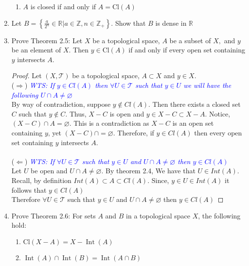 \documentclass[12pt]{article}
\newcommand{\TT}{\mathcal{T}}
\newcommand{\wts}[1]{\textit{\textcolor{blue}{WTS: #1}}\\}
\newcommand{\pp}{\textit{\textcolor{yellow}{PP: }}}%
\begin{document}
\begin{enumerate}
\begin{enumerate}
		\item[(c)] $A$ is closed if and only if $A = \mathrm { Cl } ( A )$\\
		
	\end{enumerate}
	\item[\pp2.07] Let $B=\left\{\frac{a}{2^{n}} \in \mathbb{R} | a \in \mathbb{Z}, n \in \mathbb{Z}_{+}\right\} .$ Show that $B$ is dense in $\mathbb{R}$
	
	\item[2.10] Prove Theorem 2.5: Let $X$ be a topological space, $A$ be a subset of $X,$ and $y$ be an element of $X .$ Then $y \in \mathrm{Cl}(A)$ if and only if every open set containing $y$ intersects $A$.
	\begin{proof}
		Let $ (X,\TT) $ be a topological space, $ A\subset X $ and $ y\in X $.\\
		($ \Rightarrow $) \wts{If $ y\in Cl(A) $ then $ \forall U \in \TT $ such that $ y\in U $ we will have the following $ U\cap A \not= \varnothing $}
		By way of contradiction, suppose $ y\not\in Cl(A) $. Then there exists a closed set $ C $ such that $ y\not\in C$. Thus, $ X-C $ is open and $ y\in X-C \subset X-A $. Notice, $ (X-C)\cap A = \varnothing $. This is a contradiction as $ X-C $ is an open set containing $ y $, yet $ (X-C)\cap = \varnothing $. 
		Therefore, if $ y\in Cl(A) $ then every open set containing $y$ intersects $A$.\\
		\\
		($\Leftarrow$) \wts{If $ \forall U \in \TT  $ such that $ y\in U $ and $ U\cap A \not= \varnothing $ then $ y\in Cl(A) $}
		 Let $U$ be open and $ U\cap A \not= \varnothing $. By theorem 2.4, We have that $ U \in Int(A) $. Recall, by definition $ Int(A) \subset A \subset Cl(A) $. Since, $ y\in U \in Int(A) $ it follows that $ y\in Cl(A) $\\
		Therefore $ \forall U \in \TT  $ such that $ y\in U $ and $ U\cap A \not= \varnothing $ then $ y\in Cl(A) $
	\end{proof}
	
	\item[\pp2.11] Prove Theorem 2.6: For sets $ A $ and $ B $ in a topological space $ X $, the following hold:
	\begin{enumerate}
		\item[(a)] $\mathrm { Cl } ( X - A ) = X - \operatorname { Int } ( A )$\\
		\item[(b)] $\operatorname { Int } ( A ) \cap \operatorname { Int } ( B ) = \operatorname { Int } ( A \cap B )$\\
	\end{enumerate}
	

\end{enumerate}
\end{document}
